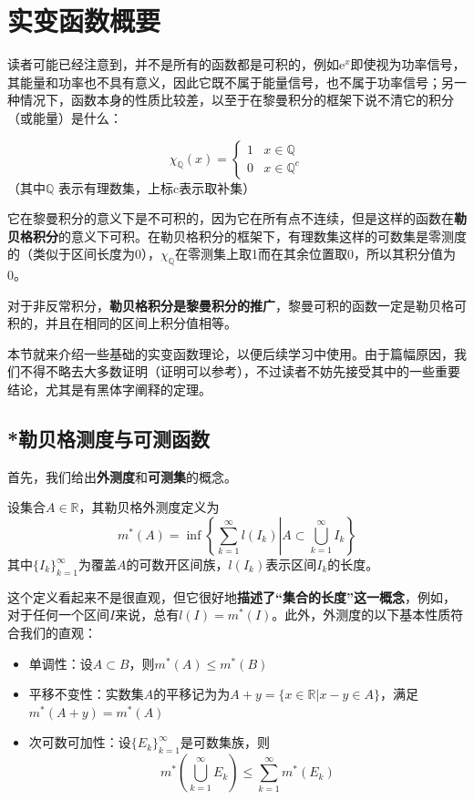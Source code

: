 \documentclass{ctexbook}
\begin{document}
\section{实变函数概要}\label{sec:Real_Analysis}

读者可能已经注意到，并不是所有的函数都是可积的，例如$\mathrm{e}^x$即使视为功率信号，其能量和功率也不具有意义，因此它既不属于能量信号，也不属于功率信号；另一种情况下，函数本身的性质比较差，以至于在黎曼积分的框架下说不清它的积分（或能量）是什么：
\begin{example}[狄利克雷函数]
    \[\chi_{\mathbb{Q}}(x)=
    \begin{cases}
        1 & x \in \mathbb{Q}    \\
        0 & x \in \mathbb{Q} ^c
    \end{cases}\]
（其中$\mathbb{Q}$ 表示有理数集，上标c表示取补集）
\end{example}
它在黎曼积分的意义下是不可积的，因为它在所有点不连续，但是这样的函数在\textbf{勒贝格积分}的意义下可积。在勒贝格积分的框架下，有理数集这样的可数集是零测度的（类似于区间长度为0），$\chi_{\mathbb{Q}}$在零测集上取1而在其余位置取0，所以其积分值为0。

对于非反常积分，\textbf{勒贝格积分是黎曼积分的推广}，黎曼可积的函数一定是勒贝格可积的，并且在相同的区间上积分值相等。

本节就来介绍一些基础的实变函数理论，以便后续学习中使用。由于篇幅原因，我们不得不略去大多数证明（证明可以参考\cite{real_analysis}），不过读者不妨先接受其中的一些重要结论，尤其是有黑体字阐释的定理。

\subsection{*勒贝格测度与可测函数}\label{sub:lebesgue}

首先，我们给出\textbf{外测度}和\textbf{可测集}的概念。
\begin{definition}[勒贝格外测度]
    设集合$A\in\mathbb{R}$，其勒贝格外测度定义为
    \[m^*(A)=\inf\left\{\sum_{k=1}^{\infty}l(I_k)\left|A\subset\bigcup_{k=1}^{\infty}I_k\right.\right\}\]
    其中$\{I_k\}_{k=1}^{\infty}$为覆盖$A$的可数开区间族，$l(I_k)$表示区间$I_k$的长度。
\end{definition}
这个定义看起来不是很直观，但它很好地\textbf{描述了“集合的长度”这一概念}，例如，对于任何一个区间$I$来说，总有$l(I)=m^*(I)$。此外，外测度的以下基本性质符合我们的直观：
\begin{proposition}[外测度的性质]
    \quad
    \begin{itemize}
        \item 单调性：设$A\subset B$，则$m^*(A)\leq m^*(B)$
        \item 平移不变性：实数集$A$的平移记为为$A+y=\{x\in \mathbb{R}|x-y\in A\}$，满足$m^*(A+y)=m^*(A)$
        \item 次可数可加性：设$\{E_k\}_{k=1}^{\infty}$是可数集族，则
        $$m^*\left(\bigcup_{k=1}^{\infty}E_k\right)\leq\sum_{k=1}^{\infty}m^*(E_k)$$
    \end{itemize}
\end{proposition}
\end{document}
